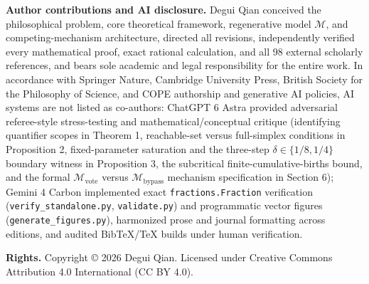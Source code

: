 \documentclass[11pt,a4paper]{article}
\begin{document}
\textbf{Author contributions and AI disclosure.} Degui Qian conceived
the philosophical problem, core theoretical framework, regenerative
model \(\mathcal{M}\), and competing-mechanism architecture, directed
all revisions, independently verified every mathematical proof, exact
rational calculation, and all 98 external scholarly references, and
bears sole academic and legal responsibility for the entire work. In
accordance with Springer Nature, Cambridge University Press, British
Society for the Philosophy of Science, and COPE authorship and
generative AI policies, AI systems are not listed as co-authors: ChatGPT
6 Astra provided adversarial referee-style stress-testing and
mathematical/conceptual critique (identifying quantifier scopes in
Theorem 1, reachable-set versus full-simplex conditions in Proposition
2, fixed-parameter saturation and the three-step
\(\delta \in \{1/8, 1/4\}\) boundary witness in Proposition 3, the
subcritical finite-cumulative-births bound, and the formal
\(\mathcal{M}_{\mathrm{vote}}\) versus \(\mathcal{M}_{\mathrm{bypass}}\)
mechanism specification in Section 6); Gemini 4 Carbon implemented exact
\texttt{fractions.Fraction} verification
(\texttt{verify\_standalone.py}, \texttt{validate.py}) and programmatic
vector figures (\texttt{generate\_figures.py}), harmonized prose and
journal formatting across editions, and audited BibTeX/TeX builds under
human verification.

\textbf{Rights.} Copyright © 2026 Degui Qian. Licensed under Creative
Commons Attribution 4.0 International (CC BY 4.0).

\clearpage
\begingroup
{}
\small
\setlength{\bibsep}{5.5pt}


\endgroup
\end{document}
